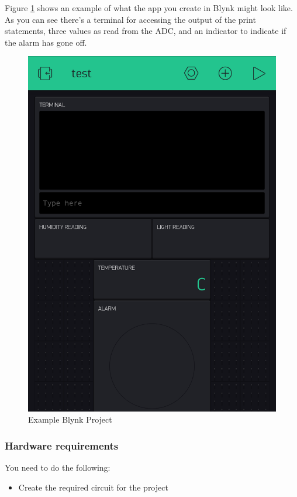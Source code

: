 \begin{multicols}{2}
Figure \ref{fig:blynkexample} shows an example of what the app you create in Blynk might look like.
As you can see there's a terminal for accessing the output of the print statements, three values as read from the ADC, and an indicator to indicate if the alarm has gone off.
\vfill\null
\columnbreak
\begin{figure}[H]
\centering
\includegraphics[width=0.75\columnwidth]{Figures/blynkexample}
\caption{Example Blynk Project}
\label{fig:blynkexample}
\end{figure}
\end{multicols}


\subsubsection{Hardware requirements}
You need to do the following:
\begin{itemize}
    \item Create the required circuit for the project
\end{itemize}

